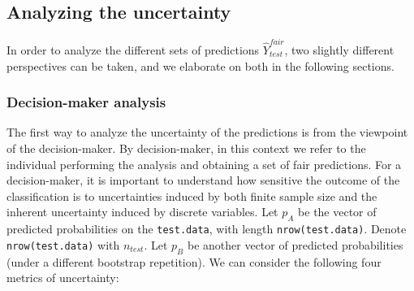 \documentclass[
  nojss]{jss}
\begin{document}
\hypertarget{analyzing-the-uncertainty}{%
\subsection{Analyzing the uncertainty}\label{analyzing-the-uncertainty}}

In order to analyze the different sets of predictions
\(\widehat{Y}^{fair}_{test}\), two slightly different perspectives can
be taken, and we elaborate on both in the following sections.

\hypertarget{decision-maker-analysis}{%
\subsubsection{Decision-maker analysis}\label{decision-maker-analysis}}

The first way to analyze the uncertainty of the predictions is from the
viewpoint of the decision-maker. By decision-maker, in this context we
refer to the individual performing the analysis and obtaining a set of
fair predictions. For a decision-maker, it is important to understand
how sensitive the outcome of the classification is to uncertainties
induced by both finite sample size and the inherent uncertainty induced
by discrete variables. Let \(p_A\) be the vector of predicted
probabilities on the \texttt{test.data}, with length
\texttt{nrow(test.data)}. Denote \texttt{nrow(test.data)} with
\(n_{test}\). Let \(p_B\) be another vector of predicted probabilities
(under a different bootstrap repetition). We can consider the following
four metrics of uncertainty:
\end{document}
